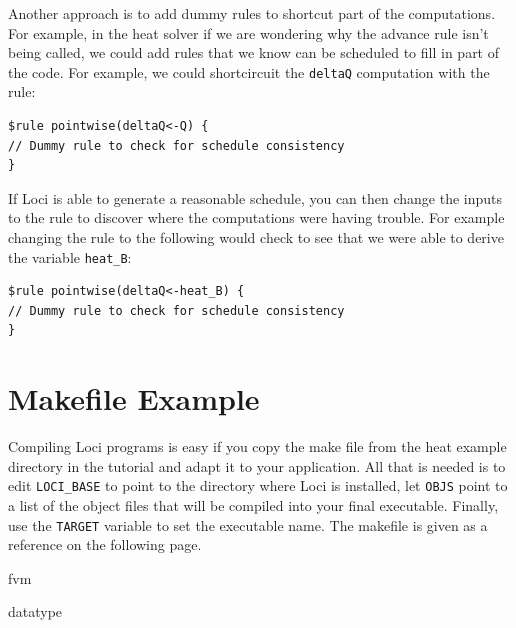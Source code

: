 \documentclass[10pt,epsf,letterpaper,twoside]{book}
\begin{document}
Another approach is to add dummy rules to shortcut part of the
computations.  For example, in the heat solver if we are wondering why
the advance rule isn't being called, we could add rules that we know
can be scheduled to fill in part of the code.  For example, we could
shortcircuit the {\tt deltaQ} computation with the rule:
\begin{verbatim}
$rule pointwise(deltaQ<-Q) {
// Dummy rule to check for schedule consistency
} 
\end{verbatim}
If Loci is able to generate a reasonable schedule, you can then change
the inputs to the rule to discover where the computations were having
trouble.  For example changing the rule to the following would check
to see that we were able to derive the variable {\tt heat\_B}:
\begin{verbatim}
$rule pointwise(deltaQ<-heat_B) {
// Dummy rule to check for schedule consistency
} 
\end{verbatim}


\appendix

\chapter { Makefile Example}
\label{chap:makefile}
Compiling Loci programs is easy if you copy the make file from the
heat example directory in the tutorial and adapt it to your
application.  All that is needed is to edit {\tt LOCI\_BASE} to point
to the directory where Loci is installed, let {\tt OBJS} point to a
list of the object files that will be compiled into your final
executable.  Finally, use the {\tt TARGET} variable to set the
executable name.  The makefile is given as a reference on the
following page.



 {fvm}

 {datatype}


%
%
\end{document}
